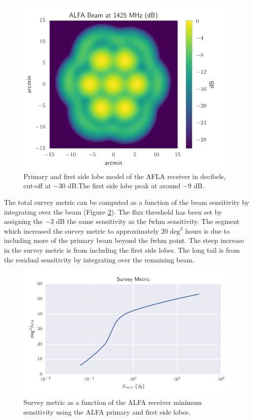 \documentclass[a4paper,fleqn,usenatbib]{mnras}
\begin{document}
\begin{figure}
    \includegraphics[width=1.0\linewidth]{figures/ALFA_beam_1425MHz_dB.pdf}
    \caption{Primary and first side lobe model of the AFLA receiver in
    decibels, cut-off at $-30$ dB.The first side lobe peak at around $-9$ dB.
    }
    \label{fig:alfa_beam}
\end{figure}

The total survey metric can be computed as a function of the beam sensitivity by
integrating over the beam (Figure \ref{fig:survey_metric_sense}). The flux
threshold has been set by assigning the $-3$ dB the same sensitivity as the
\gls{fwhm} sensitivity. The segment which increased the survey metric to
approximately $20 \; \textrm{deg}^2$ hours is due to including more of the
primary beam beyond the \gls{fwhm} point. The steep increase in the survey
metric is from including the first side lobes. The long tail is from the residual
sensitivity by integrating over the remaining beam.

\begin{figure}
    \includegraphics[width=1.0\linewidth]{figures/full_survey_metric_sense.pdf}
    \caption{Survey metric as a function of the ALFA receiver minimum
    sensitivity using the ALFA primary and first side lobes.
    }
    \label{fig:survey_metric_sense}
\end{figure}
\end{document}
